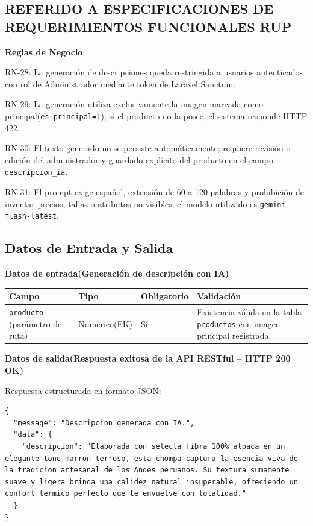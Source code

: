 \documentclass[12pt,a4paper]{article}
\begin{document}
\subsection*{REFERIDO A ESPECIFICACIONES DE REQUERIMIENTOS FUNCIONALES RUP}

\textbf{Reglas de Negocio}

RN-28: La generación de descripciones queda restringida a usuarios autenticados con rol de Administrador mediante token de Laravel Sanctum.

RN-29: La generación utiliza exclusivamente la imagen marcada como principal(\texttt{es\_principal=1}); si el producto no la posee, el sistema responde HTTP 422.

RN-30: El texto generado no se persiste automáticamente; requiere revisión o edición del administrador y guardado explícito del producto en el campo \texttt{descripcion\_ia}.

RN-31: El prompt exige español, extensión de 60 a 120 palabras y prohibición de inventar precios, tallas o atributos no visibles; el modelo utilizado es \texttt{gemini-flash-latest}.

\subsection*{Datos de Entrada y Salida}

\textbf{Datos de entrada(Generación de descripción con IA)}

\begin{center}
\small
\begin{tabularx}{\textwidth}{p{3.2cm} p{2.8cm} p{1.8cm} L}
\toprule
\textbf{Campo} & \textbf{Tipo} & \textbf{Obligatorio} & \textbf{Validación} \\
\midrule
\texttt{producto} (parámetro de ruta) & Numérico(FK) & Sí & Existencia válida en la tabla \texttt{productos} con imagen principal registrada. \\
\bottomrule
\end{tabularx}
\end{center}

\textbf{Datos de salida(Respuesta exitosa de la API RESTful -- HTTP 200 OK)}

Respuesta estructurada en formato JSON:

\begin{lstlisting}
{
  "message": "Descripcion generada con IA.",
  "data": {
    "descripcion": "Elaborada con selecta fibra 100% alpaca en un elegante tono marron terroso, esta chompa captura la esencia viva de la tradicion artesanal de los Andes peruanos. Su textura sumamente suave y ligera brinda una calidez natural insuperable, ofreciendo un confort termico perfecto que te envuelve con totalidad."
  }
}
\end{lstlisting}
\end{document}
